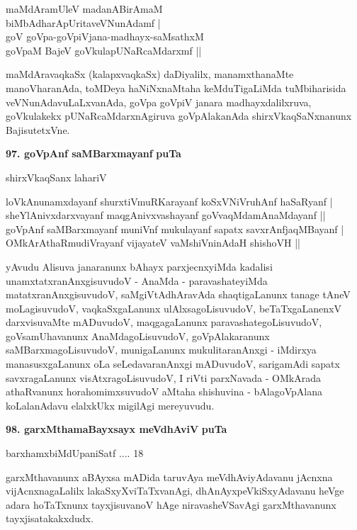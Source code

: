 \begin{shloka}
maMdAramUleV madanABirAmaM\\
biMbAdharApUritaveVNunAdamf |\\
goV goVpa-goVpiVjana-madhayx-saMsathxM \\
goVpaM BajeV goVkulapUNaRcaMdarxmf ||
\end{shloka}

maMdAravaqkaSx (kalapxvaqkaSx) daDiyalilx, manamxthanaMte manoVharanAda, toMDeya haNiNxnaMtaha keMduTigaLiMda tuMbiharisida veVNunAdavuLaLxvanAda, goVpa goVpiV janara madhayxdalilxruva, goVkulakekx pUNaRcaMdarxnAgiruva goVpAlakanAda shirxVkaqSaNxnanunx BajisutetxVne.


\smallskip
\noindent
\textbf{97. goVpAnf saMBarxmayanf} \hfill{\bf puTa }

\hfill{shirxVkaqSanx lahariV}

\begin{shloka}
loVkAnunamxdayanf shurxtiVmuRKarayanf koSxVNiVruhAnf haSaRyanf |\\
sheYlAnivxdarxvayanf maqgAnivxvashayanf goVvaqMdamAnaMdayanf ||\\
goVpAnf saMBarxmayanf muniVnf mukulayanf sapatx savxrAnfjaqMBayanf |\\
OMkArAthaRmudiVrayanf vijayateV vaMshiVninAdaH shishoVH ||
\end{shloka}

\smallskip
yAvudu Alisuva janaranunx bAhayx parxjecnxyiMda kadalisi unamxtatxranAnxgisuvudoV  - AnaMda - paravashateyiMda matatxranAnxgisuvudoV, saMgiVtAdhAravAda shaqtigaLanunx tanage tAneV moLagisuvudoV, vaqkaSxgaLanunx ulAlxsagoLisuvudoV, beTaTxgaLanenxV darxvisuvaMte mADuvudoV, maqgagaLanunx paravashategoLisuvudoV, goVsamUhavanunx AnaMdagoLisuvudoV, goVpAlakaranunx saMBarxmagoLisuvudoV, munigaLanunx mukulitaranAnxgi - iMdirxya manasusxgaLanunx oLa seLedavaranAnxgi mADuvudoV, sarigamAdi sapatx savxragaLanunx visAtxragoLisuvudoV, I riVti parxNavada - OMkArada athaRvanunx horahomimxsuvudoV aMtaha shishuvina - bAlagoVpAlana koLalanAdavu elalxkUkx migilAgi mereyuvudu.

\medskip
\noindent
\textbf{98. garxMthamaBayxsayx meVdhAviV} \hfill{\bf puTa }

\hfill{barxhamxbiMdUpaniSatf .... 18}

\smallskip
garxMthavanunx aBAyxsa mADida taruvAya meVdhAviyAdavanu jAcnxna vijAcnxnagaLalilx lakaSxyXviTaTxvanAgi, dhAnAyxpeVkiSxyAdavanu heVge adara hoTaTxnunx tayxjisuvanoV hAge niravasheVSavAgi garxMthavanunx tayxjisatakakxdudx.

